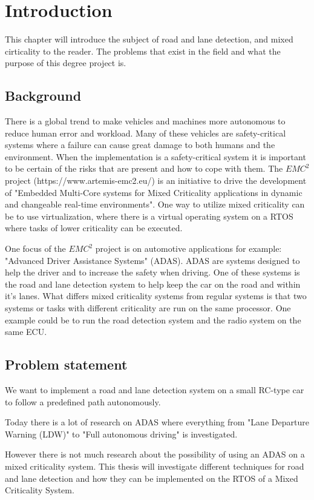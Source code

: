 \chapter{Introduction}
\label{sec:introduction}
This chapter will introduce the subject of road and lane detection, and mixed cirticality to the reader. The problems that exist in the field and what the purpose of this degree project is.


\section{Background}
There is a global trend to make vehicles and machines more autonomous to reduce human error and workload. Many of these vehicles are safety-critical systems where a failure can cause great damage to both humans and the environment. When the implementation is a safety-critical system it is important to be certain of the risks that are present and how to cope with them. The $EMC^2$ project (https://www.artemis-emc2.eu/) is an initiative to drive the development of "Embedded Multi-Core systems for Mixed Criticality applications in dynamic and changeable real-time environments". One way to utilize mixed criticality can be to use virtualization, where there is a virtual operating system on a RTOS where tasks of lower criticality can be executed.

One focus of the $EMC^2$ project is on automotive applications for example: "Advanced Driver Assistance Systems" (ADAS). ADAS are systems designed to help the driver and to increase the safety when driving. One of these systems is the road and lane detection system to help keep the car on the road and within it's lanes. What differs mixed criticality systems from regular systems is that two systems or tasks with different criticality are run on the same processor. One example could be to run the road detection system and the radio system on the same ECU. 


\section{Problem statement}
We want to implement a road and lane detection system on a small RC-type car to follow a predefined path autonomously. 

Today there is a lot of research on ADAS where everything from "Lane Departure Warning (LDW)" to "Full autonomous driving" is investigated. 

However there is not much research about the possibility of using an ADAS on a mixed criticality system. This thesis will investigate different techniques for road and lane detection and how they can be implemented on the RTOS of a Mixed Criticality System.


